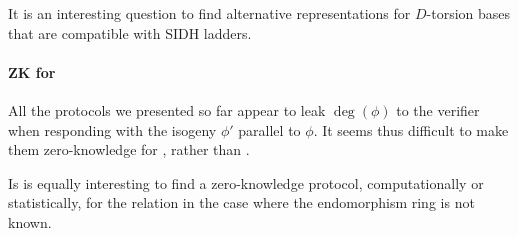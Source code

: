 It is an interesting question to find alternative representations for
$D$-torsion bases that are compatible with SIDH ladders.

\paragraph{ZK for \R[isog]}
All the protocols we presented so far appear to leak $\deg(\phi)$ to
the verifier when responding with the isogeny $\phi'$ parallel to
$\phi$. It seems thus difficult to make them zero-knowledge for
\R[isog], rather than \R[deg].

Is is equally interesting to find a zero-knowledge protocol,
computationally or statistically, for the \R[isog] relation in the case where the endomorphism ring is not known.
